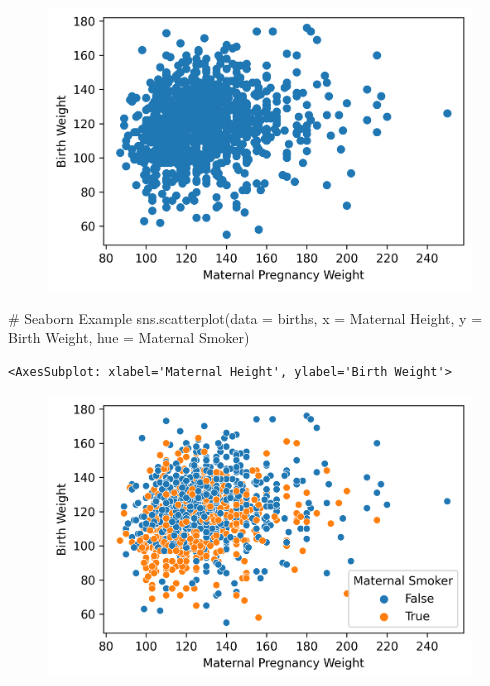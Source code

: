 \documentclass[
  letterpaper,
  DIV=11,
  numbers=noendperiod]{scrreprt}
\newenvironment{Shaded}{\begin{snugshade}}{\end{snugshade}}
\newcommand{\CommentTok}[1]{\textcolor[rgb]{0.37,0.37,0.37}{#1}}
\newcommand{\NormalTok}[1]{\textcolor[rgb]{0.00,0.23,0.31}{#1}}
\newcommand{\OperatorTok}[1]{\textcolor[rgb]{0.37,0.37,0.37}{#1}}
\newcommand{\StringTok}[1]{\textcolor[rgb]{0.13,0.47,0.30}{#1}}
\begin{document}
\begin{figure}[H]

{\centering \includegraphics{visualization_2/visualization_2_files/figure-pdf/cell-7-output-1.png}

}

\end{figure}

\begin{Shaded}
\begin{Highlighting}[]
\CommentTok{\# Seaborn Example}
\NormalTok{sns.scatterplot(data }\OperatorTok{=}\NormalTok{ births, x }\OperatorTok{=} \StringTok{\textquotesingle{}Maternal Height\textquotesingle{}}\NormalTok{, y }\OperatorTok{=} \StringTok{\textquotesingle{}Birth Weight\textquotesingle{}}\NormalTok{,}
\NormalTok{                hue }\OperatorTok{=} \StringTok{\textquotesingle{}Maternal Smoker\textquotesingle{}}\NormalTok{)}
\end{Highlighting}
\end{Shaded}

\begin{verbatim}
<AxesSubplot: xlabel='Maternal Height', ylabel='Birth Weight'>
\end{verbatim}

\begin{figure}[H]

{\centering \includegraphics{visualization_2/visualization_2_files/figure-pdf/cell-8-output-2.png}

}

\end{figure}
\end{document}
